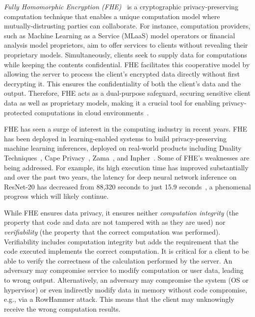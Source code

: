 
\textit{Fully Homomorphic Encryption (FHE)}~\cite{gentry2009fully, brakerski2014leveled, halevi2019BFVimproved, kim2022approximate} is a cryptographic privacy-preserving computation technique that enables a unique computation model where mutually-distrusting parties can collaborate. For instance, computation providers, such as Machine Learning as a Service (MLaaS) model operators or financial analysis model proprietors, aim to offer services to clients without revealing their proprietary models. Simultaneously, clients seek to supply data for computations while keeping the contents confidential. 
FHE facilitates this cooperative model by allowing the server to process the client's encrypted data directly without first decrypting it. This ensures the confidentiality of both the client's data and the output. Therefore, FHE acts as a dual-purpose safeguard, securing sensitive client data as well as proprietary models, making it a crucial tool for enabling privacy-protected computations in cloud environments~\cite{AmazonScience, IBMSecurity, GoogleCloud, Google, Microsoft, reagen2021cheetah}.

FHE has seen a surge of interest in the computing industry in recent years. FHE has been deployed in learning-enabled systems to build privacy-preserving machine learning inferences, deployed on real-world products including Duality Techniques~\cite{DualityTech}, Cape Privacy~\cite{capeprivacy}, Zama~\cite{Zama}, and Inpher~\cite{Inpher}. Some of FHE's weaknesses are being addressed. For example, its high execution time has improved substantially and over the past two years, the latency for deep neural network inference on ResNet-20 has decreased from 88,320 seconds to just 15.9 seconds~\cite{fan2023tensorfhe,samardzic2022craterlake, kim2022ark}, a phenomenal progress which will likely continue.


While FHE ensures data privacy, it ensures neither {\em computation integrity} (the property that code and data are not tampered with as they are used) nor {\em verifiability} (the property that the correct computation was performed). Verifiability includes computation integrity but adds the requirement that the code executed implements the correct computation. It is critical for a client to be able to verify the correctness of the calculation performed by the server. An adversary may compromise service to modify computation or user data,  leading to wrong output. Alternatively, an adversary may compromise the system (OS or hypervisor) or even indirectly modify data in memory without code compromise, e.g., via a RowHammer attack. This means that the client may unknowingly receive the wrong computation results. 

